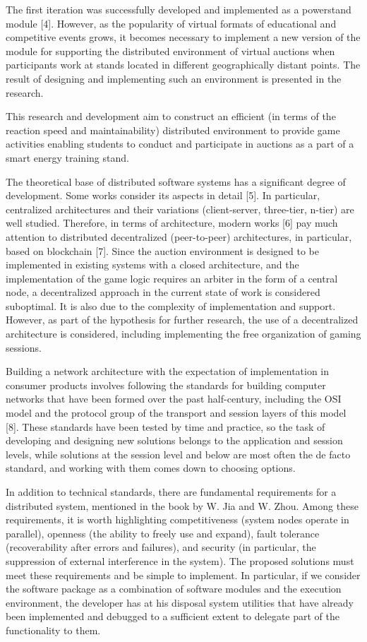 \documentclass[
]{ceurart}
\begin{document}
The first iteration was successfully developed and implemented as a powerstand module [4]. However, as the popularity of virtual formats of educational and competitive events grows, it becomes necessary to implement a new version of the module for supporting the distributed environment of virtual auctions when participants work at stands located in different geographically distant points. The result of designing and implementing such an environment is presented in the research.

This research and development aim to construct an efficient (in terms of the reaction speed and maintainability) distributed environment to provide game activities enabling students to conduct and participate in auctions as a part of a smart energy training stand.

The theoretical base of distributed software systems has a significant degree of development. Some works consider its aspects in detail [5]. In particular, centralized architectures and their variations (client-server, three-tier, n-tier) are well studied. Therefore, in terms of architecture, modern works [6] pay much attention to distributed decentralized (peer-to-peer) architectures, in particular, based on blockchain [7]. Since the auction environment is designed to be implemented in existing systems with a closed architecture, and the implementation of the game logic requires an arbiter in the form of a central node, a decentralized approach in the current state of work is considered suboptimal. It is also due to the complexity of implementation and support. However, as part of the hypothesis for further research, the use of a decentralized architecture is considered, including implementing the free organization of gaming sessions.

Building a network architecture with the expectation of implementation in consumer products involves following the standards for building computer networks that have been formed over the past half-century, including the OSI model and the protocol group of the transport and session layers of this model [8]. These standards have been tested by time and practice, so the task of developing and designing new solutions belongs to the application and session levels, while solutions at the session level and below are most often the de facto standard, and working with them comes down to choosing options.

In addition to technical standards, there are fundamental requirements for a distributed system, mentioned in the book by W. Jia and W. Zhou. Among these requirements, it is worth highlighting competitiveness (system nodes operate in parallel), openness (the ability to freely use and expand), fault tolerance (recoverability after errors and failures), and security (in particular, the suppression of external interference in the system). The proposed solutions must meet these requirements and be simple to implement. In particular, if we consider the software package as a combination of software modules and the execution environment, the developer has at his disposal system utilities that have already been implemented and debugged to a sufficient extent to delegate part of the functionality to them.
\end{document}
